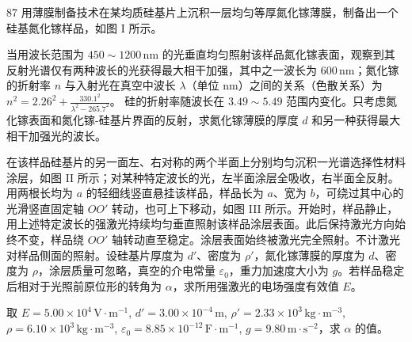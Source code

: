 \begin{problem}[第34届物理决赛][薄膜干涉与光压]{87}
    用薄膜制备技术在某均质硅基片上沉积一层均匀等厚氮化镓薄膜，制备出一个硅基氮化镓样品，如图 I 所示。
    \begin{subproblem}
        \begin{subsubproblem}
            当用波长范围为 $450\sim1200\,\mathrm{nm}$ 的光垂直均匀照射该样品氮化镓表面，观察到其反射光谱仅有两种波长的光获得最大相干加强，其中之一波长为 $600\,\mathrm{nm}$；氮化镓的折射率 $n$ 与入射光在真空中波长 $\lambda$（单位 $\mathrm{nm}$）之间的关系（色散关系）为
            $n^{2} = 2.26^{2} + \frac{330.1^{2}}{\lambda^{2} - 265.7^{2}}$。
            硅的折射率随波长在 $3.49\sim5.49$ 范围内变化。只考虑氮化镓表面和氮化镓-硅基片界面的反射，求氮化镓薄膜的厚度 $d$ 和另一种获得最大相干加强光的波长。
        \end{subsubproblem}
        \begin{subsubproblem}
            在该样品硅基片的另一面左、右对称的两个半面上分别均匀沉积一光谱选择性材料涂层，如图 II 所示；对某种特定波长的光，左半面涂层全吸收，右半面全反射。用两根长均为 $a$ 的轻细线竖直悬挂该样品，样品长为 $a$、宽为 $b$，可绕过其中心的光滑竖直固定轴 $OO'$ 转动，也可上下移动，如图 III 所示。开始时，样品静止，用上述特定波长的强激光持续均匀垂直照射该样品涂层表面。此后保持激光方向始终不变，样品绕 $OO'$ 轴转动直至稳定。涂层表面始终被激光完全照射。不计激光对样品侧面的照射。设硅基片厚度为 $d'$、密度为 $\rho'$，氮化镓薄膜的厚度为 $d$、密度为 $\rho$，涂层质量可忽略，真空的介电常量 $\varepsilon_{0}$，重力加速度大小为 $g$。若样品稳定后相对于光照前原位形的转角为 $\alpha$，求所用强激光的电场强度有效值 $E$。
        \end{subsubproblem}
        \begin{subsubproblem}
            取 $E = 5.00\times10^{4}\,\mathrm{V\cdot m^{-1}}$, $d' = 3.00\times10^{-4}\,\mathrm{m}$, $\rho' = 2.33\times10^{3}\,\mathrm{kg\cdot m^{-3}}$, $\rho = 6.10\times10^{3}\,\mathrm{kg\cdot m^{-3}}$, $\varepsilon_{0} = 8.85\times10^{-12}\,\mathrm{F\cdot m^{-1}}$, $g = 9.80\,\mathrm{m\cdot s^{-2}}$，求 $\alpha$ 的值。
        \end{subsubproblem}
    \end{subproblem}
\end{problem}